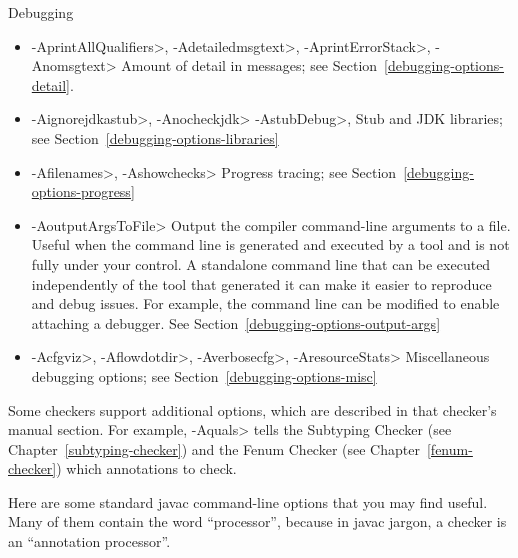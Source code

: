 Debugging
\begin{itemize}
\item
 \<-AprintAllQualifiers>,
 \<-Adetailedmsgtext>,
 \<-AprintErrorStack>,
 \<-Anomsgtext>
Amount of detail in messages; see Section~\ref{debugging-options-detail}.

\item
 \<-Aignorejdkastub>,
 \<-Anocheckjdk>
 \<-AstubDebug>,
Stub and JDK libraries; see Section~\ref{debugging-options-libraries}

\item
 \<-Afilenames>,
 \<-Ashowchecks>
Progress tracing; see Section~\ref{debugging-options-progress}

\item
\<-AoutputArgsToFile>
Output the compiler command-line arguments to a file.  Useful when the command line is generated and executed by a tool and is not
fully under your control.  A standalone command line that can be executed
independently of the tool that generated it can make it easier to reproduce
and debug issues.  For example, the command line can be modified to enable
attaching a debugger.
See Section~\ref{debugging-options-output-args}

\item
 \<-Acfgviz>,
 \<-Aflowdotdir>,
 \<-Averbosecfg>,
 \<-AresourceStats>
Miscellaneous debugging options; see Section~\ref{debugging-options-misc}
\end{itemize}


\noindent
Some checkers support additional options, which are described in that
checker's manual section.
For example, \<-Aquals> tells
the Subtyping Checker (see Chapter~\ref{subtyping-checker}) and the Fenum Checker
(see Chapter~\ref{fenum-checker}) which annotations to check.


Here are some standard javac command-line options that you may find useful.
Many of them contain the word ``processor'', because in javac jargon, a
checker is an ``annotation processor''.

